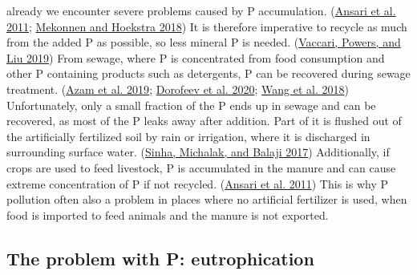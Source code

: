 \documentclass[a4paper,11pt]{article}
\begin{document}
already we encounter severe problems caused by P accumulation. (\protect\hyperlink{ref-ansariEutrophicationCausesConsequences2011}{Ansari et al. 2011}; \protect\hyperlink{ref-mekonnenGlobalAnthropogenicPhosphorus2018}{Mekonnen and Hoekstra 2018}) It is therefore imperative to recycle as much from the added P as possible, so less mineral P is needed. (\protect\hyperlink{ref-vaccariDemandDrivenModelGlobal2019}{Vaccari, Powers, and Liu 2019}) From sewage, where P is concentrated from food consumption and other P containing products such as detergents, P can be recovered during sewage treatment. (\protect\hyperlink{ref-azamPhosphorousEnvironmentCharacteristics2019}{Azam et al. 2019}; \protect\hyperlink{ref-dorofeevRolePhosphateaccumulatingBacteria2020a}{Dorofeev et al. 2020}; \protect\hyperlink{ref-wangPhosphorusCompetitionBioinduced2018}{Wang et al. 2018}) Unfortunately, only a small fraction of the P ends up in sewage and can be recovered, as most of the P leaks away after addition. Part of it is flushed out of the artificially fertilized soil by rain or irrigation, where it is discharged in surrounding surface water. (\protect\hyperlink{ref-sinhaEutrophicationWillIncrease2017}{Sinha, Michalak, and Balaji 2017}) Additionally, if crops are used to feed livestock, P is accumulated in the manure and can cause extreme concentration of P if not recycled. (\protect\hyperlink{ref-ansariEutrophicationCausesConsequences2011}{Ansari et al. 2011}) This is why P pollution often also a problem in places where no artificial fertilizer is used, when food is imported to feed animals and the manure is not exported.

\hypertarget{the-problem-with-p-eutrophication}{%
\subsection{The problem with P: eutrophication}\label{the-problem-with-p-eutrophication}}
\end{document}

